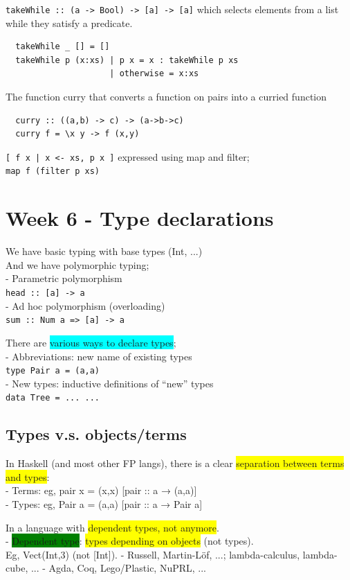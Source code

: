 \documentclass[tikz,border=10pt]{project_plan}
\begin{document}
\lstinline?takeWhile :: (a -> Bool) -> [a] -> [a]?
which selects elements from a list while they satisfy a predicate.
\begin{lstlisting}
  takeWhile _ [] = []
  takeWhile p (x:xs) | p x = x : takeWhile p xs
                     | otherwise = x:xs
\end{lstlisting}

The function curry that converts a function on pairs into a curried function
\begin{lstlisting}
  curry :: ((a,b) -> c) -> (a->b->c)
  curry f = \x y -> f (x,y)
\end{lstlisting}

\lstinline?[ f x | x <- xs, p x ]? expressed using map and filter;\\
\lstinline?map f (filter p xs)?

\chapter{Week 6 - Type declarations}

We have basic typing with base types (Int, ...)\\
And we have polymorphic typing;\\
- Parametric polymorphism\\
\lstinline?head :: [a] -> a?\\
- Ad hoc polymorphism (overloading)\\
\lstinline?sum :: Num a => [a] -> a?

There are \colorbox{cyan}{various ways to declare types};\\
- Abbreviations: new name of existing types\\
\lstinline?type Pair a = (a,a)?\\
- New types: inductive definitions of “new” types\\
\lstinline?data Tree = ... ...?

\section{Types v.s. objects/terms}

In Haskell (and most other FP langs), there is a clear
\colorbox{yellow}{separation between terms and types}:\\
- Terms: eg, pair x = (x,x) [pair :: a → (a,a)]\\
- Types: eg, Pair a = (a,a) [pair :: a → Pair a]

In a language with \colorbox{yellow}{dependent types, not anymore}.\\
- \colorbox{green}{Dependent type}: \colorbox{yellow}{types depending on objects} (not types).\\
Eg, Vect(Int,3) (not [Int]).
- Russell, Martin-L{\"o}f, ...; lambda-calculus, lambda-cube, ...
- Agda, Coq, Lego/Plastic, NuPRL, ...
\end{document}
